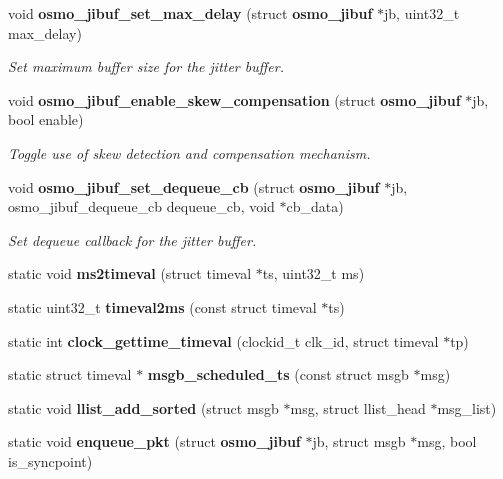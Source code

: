 \begin{DoxyCompactItemize}
void {\bf osmo\+\_\+jibuf\+\_\+set\+\_\+max\+\_\+delay} (struct {\bf osmo\+\_\+jibuf} $\ast$jb, uint32\+\_\+t max\+\_\+delay)
\begin{DoxyCompactList}\small\item\em Set maximum buffer size for the jitter buffer. \end{DoxyCompactList}\item 
void {\bf osmo\+\_\+jibuf\+\_\+enable\+\_\+skew\+\_\+compensation} (struct {\bf osmo\+\_\+jibuf} $\ast$jb, bool enable)
\begin{DoxyCompactList}\small\item\em Toggle use of skew detection and compensation mechanism. \end{DoxyCompactList}\item 
void {\bf osmo\+\_\+jibuf\+\_\+set\+\_\+dequeue\+\_\+cb} (struct {\bf osmo\+\_\+jibuf} $\ast$jb, osmo\+\_\+jibuf\+\_\+dequeue\+\_\+cb dequeue\+\_\+cb, void $\ast$cb\+\_\+data)
\begin{DoxyCompactList}\small\item\em Set dequeue callback for the jitter buffer. \end{DoxyCompactList}\item 
static void {\bfseries ms2timeval} (struct timeval $\ast$ts, uint32\+\_\+t ms)\label{group__jibuf_ga22ad99a583ea1ce64649e66927e35b58}

\item 
static uint32\+\_\+t {\bfseries timeval2ms} (const struct timeval $\ast$ts)\label{group__jibuf_ga929b4c3096040e2edbe1c3fcc24f2801}

\item 
static int {\bfseries clock\+\_\+gettime\+\_\+timeval} (clockid\+\_\+t clk\+\_\+id, struct timeval $\ast$tp)\label{group__jibuf_ga13c93b0cf89cb3735793eb5744d9a2f0}

\item 
static struct timeval $\ast$ {\bfseries msgb\+\_\+scheduled\+\_\+ts} (const struct msgb $\ast$msg)\label{group__jibuf_gaec17630d5fd1f9edf79d80bf6891d1b0}

\item 
static void {\bfseries llist\+\_\+add\+\_\+sorted} (struct msgb $\ast$msg, struct llist\+\_\+head $\ast$msg\+\_\+list)\label{group__jibuf_gae8e8e82a07be4b565d621999c5c6df93}

\item 
static void {\bfseries enqueue\+\_\+pkt} (struct {\bf osmo\+\_\+jibuf} $\ast$jb, struct msgb $\ast$msg, bool is\+\_\+syncpoint)\label{group__jibuf_ga7f8028cbd2f9a2f177a5f1ce146e1e0f}


\end{DoxyCompactItemize}

